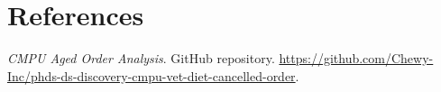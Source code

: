 \section*{References}\label{references}
\begin{enumerate}[label={[\arabic*]},leftmargin=*]
\item \label{ref:analysis-repository}\emph{CMPU Aged Order Analysis}. GitHub repository. \url{https://github.com/Chewy-Inc/phds-ds-discovery-cmpu-vet-diet-cancelled-order}.
\end{enumerate}

